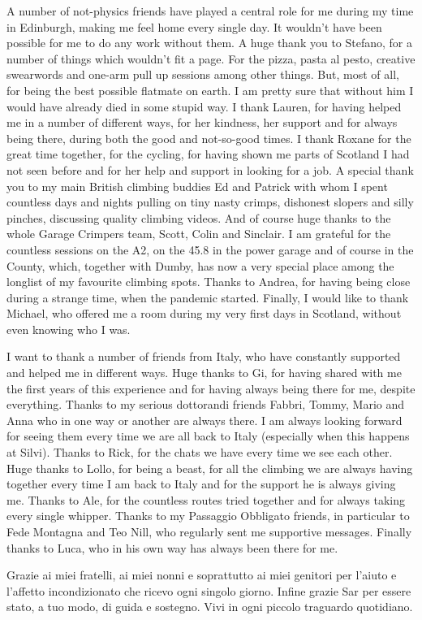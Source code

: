 A number of not-physics friends have played a central role for me during my time in Edinburgh,
making me feel home every single day. It wouldn't have been possible for me to do any work without them.
% 
A huge thank you to Stefano, for a number of things which wouldn't fit a page. For the pizza, pasta al pesto,
creative swearwords and one-arm pull up sessions among other things. 
But, most of all, for being the best possible flatmate on earth.
I am pretty sure that without him I would have already died in some stupid way. 
%
I thank Lauren, for having helped me in a number of different ways, for her kindness, her support and for always being there,
during both the good and not-so-good times.  
I thank Roxane for the great time together, for the cycling, for having shown me parts of Scotland 
I had not seen before and for her help and support in looking for a job. 
%
A special thank you to my main British climbing buddies Ed and Patrick with whom I spent countless days and nights
pulling on tiny nasty crimps, dishonest slopers and silly pinches, discussing quality climbing videos.
And of course huge thanks to the whole Garage Crimpers team,
Scott, Colin and Sinclair. I am grateful for the countless sessions on the A2, on the 45.8 in the power garage 
and of course in the County, which, together with Dumby, has now a very special place among the longlist of my
favourite climbing spots. 
%
Thanks to Andrea, for having being close during a strange time, when the pandemic started.
Finally, I would like to thank Michael, who offered me a room during my very first days in Scotland, without even knowing 
who I was.

%   
I want to thank a number of friends from Italy, who have constantly supported and helped me in different ways.
Huge thanks to Gi, for having shared with me the first years of this experience and for having always being there for me,
despite everything.
Thanks to my serious dottorandi friends Fabbri, Tommy, Mario and Anna who in one way or another are always there.
I am always looking forward for seeing them every time we are all back to Italy (especially when this happens at Silvi). 
Thanks to Rick, for the chats we have every time we see each other.
Huge thanks to Lollo, for being a beast, for all the climbing we are always having together every time
I am back to Italy and for the support he is always giving me.
Thanks to Ale, for the countless routes tried together and for always taking every single whipper.
Thanks to my Passaggio Obbligato friends, in particular to Fede Montagna and Teo Nill, who 
regularly sent me supportive messages. 
Finally thanks to Luca, who in his own way has always been there for me.

Grazie ai miei fratelli, ai miei nonni e soprattutto ai miei genitori per l'aiuto e l'affetto incondizionato
che ricevo ogni singolo giorno. 
Infine grazie Sar per essere stato, a tuo modo, di guida e sostegno. Vivi in ogni piccolo traguardo quotidiano.

\blankpage
 



